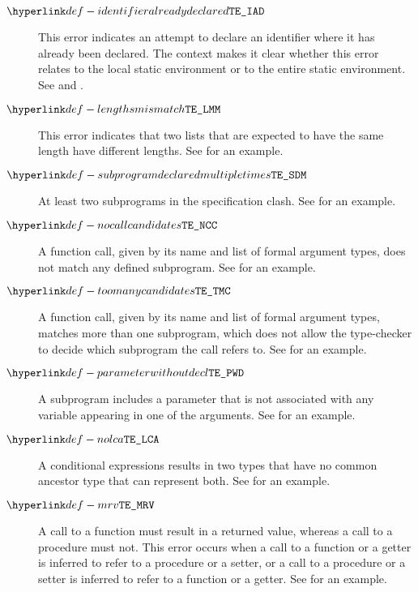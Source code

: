 \begin{description}
\hypertarget{def-identifieralreadydeclared}{}
\item[$\IdentifierAlreadyDeclared$]
This error indicates an attempt to declare an identifier where it has already been declared.
The context makes it clear whether this error relates to the local static environment or to the
entire static environment.
See  and .

\hypertarget{def-lengthsmismatch}{}
\item[$\LengthsMismatch$]
This error indicates that two lists that are expected to have the same length have different lengths.
See  for an example.

\hypertarget{def-subprogramdeclaredmultipletimes}{}
\item[$\SubrogramDeclaredMultipleTimes$]
At least two subprograms in the specification clash.
See  for an example.

\hypertarget{def-nocallcandidates}{}
\item[$\NoCallCandidates$]
A function call, given by its name and list of formal argument types, does not match any defined subprogram.
See  for an example.

\hypertarget{def-toomanycandidates}{}
\item[$\TooManyCandidates$]
A function call, given by its name and list of formal argument types, matches more than one subprogram,
which does not allow the type-checker to decide which subprogram the call refers to.
See  for an example.

\hypertarget{def-parameterwithoutdecl}{}
\item[$\ParameterWithoutDecl$]
A subprogram includes a parameter that is not associated with any variable appearing in one of the arguments.
See  for an example.

\hypertarget{def-nolca}{}
\item[$\NoLCA$]
A conditional expressions results in two types that have no common ancestor type that can represent both.
See  for an example.

\hypertarget{def-mrv}{}
\item[$\MismatchedReturnValue$]
A call to a function must result in a returned value,
whereas a call to a procedure must not.
This error occurs when a call to a function or a getter is inferred to refer to a procedure or a setter,
or a call to a procedure or a setter is inferred to refer to a function or a getter.
See  for an example.


\end{description}
